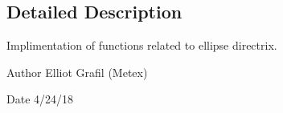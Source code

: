 \subsection{Detailed Description}
Implimentation of functions related to ellipse directrix. 

\begin{DoxyAuthor}{Author}
Elliot Grafil (Metex) 
\end{DoxyAuthor}
\begin{DoxyDate}{Date}
4/24/18 
\end{DoxyDate}
